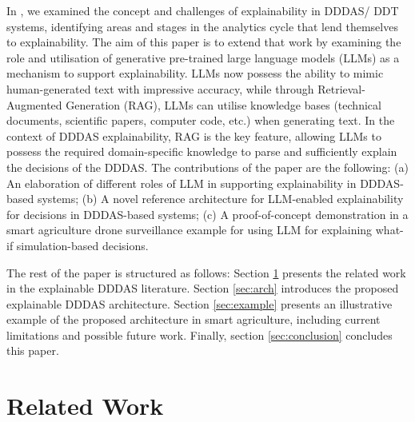 \documentclass[runningheads]{llncs}
\begin{document}

In \cite{zhang_explainable_2024}, we examined the concept and challenges of explainability in DDDAS/ DDT systems, identifying areas and stages in the analytics cycle that lend themselves to explainability. The aim of this paper is to extend that work by examining the role and utilisation of generative pre-trained large language models (LLMs) as a mechanism to support explainability. LLMs now possess the ability to mimic human-generated text with impressive accuracy, while through Retrieval-Augmented Generation (RAG), LLMs can utilise knowledge bases (technical documents, scientific papers, computer code, etc.) when generating text. In the context of DDDAS explainability, RAG is the key feature, allowing LLMs to possess the required domain-specific knowledge to parse and sufficiently explain the decisions of the DDDAS. The contributions of the paper are the following: (a) An elaboration of different roles of LLM in supporting explainability in DDDAS-based systems; (b) A novel reference architecture for LLM-enabled explainability for decisions in DDDAS-based systems; (c) A proof-of-concept demonstration in a smart agriculture drone surveillance example for using LLM for explaining what-if simulation-based decisions.


The rest of the paper is structured as follows: Section \ref{sec:related-work} presents the related work in the explainable DDDAS literature. Section \ref{sec:arch} introduces the proposed explainable DDDAS architecture. Section \ref{sec:example} presents an illustrative example of the proposed architecture in smart agriculture, including current limitations and possible future work. Finally, section \ref{sec:conclusion} concludes this paper.

\vspace{-.3cm}
\section{Related Work} \label{sec:related-work}
\vspace{-.2cm}
\end{document}

